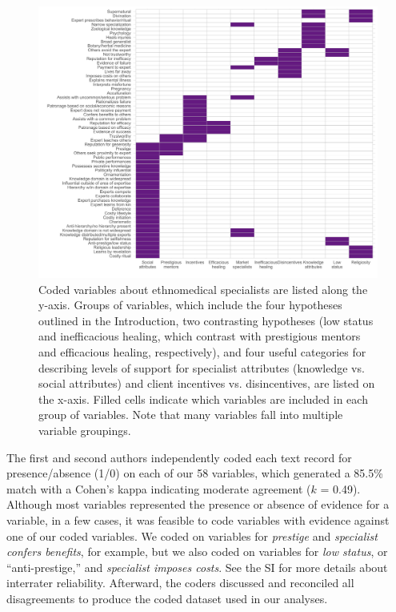 \documentclass[
  11pt,
]{article}
\begin{document}
\begin{figure}[p]

{\centering \includegraphics{magic-healers-article2_files/figure-latex/ehraftilevars-1} 

}

\caption{Coded variables about ethnomedical specialists are listed along the y-axis. Groups of variables, which include the four hypotheses outlined in the Introduction, two contrasting hypotheses (low status and inefficacious healing, which contrast with prestigious mentors and efficacious healing, respectively), and four useful categories for describing levels of support for specialist attributes (knowledge vs. social attributes) and client incentives vs. disincentives, are listed on the x-axis. Filled cells indicate which variables are included in each group of variables. Note that many variables fall into multiple variable groupings.}\label{fig:ehraftilevars}
\end{figure}

The first and second authors independently coded each text record for presence/absence (1/0) on each of our 58 variables, which generated a 85.5\% match with a Cohen's kappa indicating moderate agreement (\(k\) = 0.49). Although most variables represented the presence or absence of evidence for a variable, in a few cases, it was feasible to code variables with evidence against one of our coded variables. We coded on variables for \emph{prestige} and \emph{specialist confers benefits}, for example, but we also coded on variables for \emph{low status}, or ``anti-prestige,'' and \emph{specialist imposes costs}. See the SI for more details about interrater reliability. Afterward, the coders discussed and reconciled all disagreements to produce the coded dataset used in our analyses.
\end{document}

